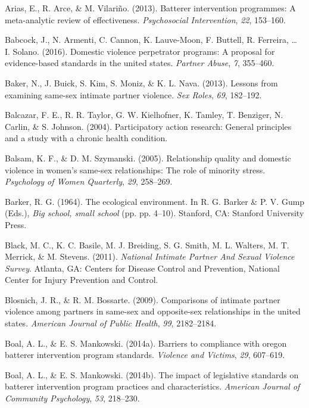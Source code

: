 \documentclass[11pt,]{tufte-book}
\begin{document}
\hypertarget{ref-arias2013batterer}{}
Arias, E., R. Arce, \& M. Vilariño. (2013). Batterer intervention
programmes: A meta-analytic review of effectiveness. \emph{Psychosocial
Intervention}, \emph{22}, 153--160.

\hypertarget{ref-babcock2016domestic}{}
Babcock, J., N. Armenti, C. Cannon, K. Lauve-Moon, F. Buttell, R.
Ferreira, \ldots{} I. Solano. (2016). Domestic violence perpetrator
programs: A proposal for evidence-based standards in the united states.
\emph{Partner Abuse}, \emph{7}, 355--460.

\hypertarget{ref-baker2013lessons}{}
Baker, N., J. Buick, S. Kim, S. Moniz, \& K. L. Nava. (2013). Lessons
from examining same-sex intimate partner violence. \emph{Sex Roles},
\emph{69}, 182--192.

\hypertarget{ref-balcazar2004participatory}{}
Balcazar, F. E., R. R. Taylor, G. W. Kielhofner, K. Tamley, T. Benziger,
N. Carlin, \& S. Johnson. (2004). Participatory action research: General
principles and a study with a chronic health condition.

\hypertarget{ref-balsam2005relationship}{}
Balsam, K. F., \& D. M. Szymanski. (2005). Relationship quality and
domestic violence in women's same-sex relationships: The role of
minority stress. \emph{Psychology of Women Quarterly}, \emph{29},
258--269.

\hypertarget{ref-barker1964ecological}{}
Barker, R. G. (1964). The ecological environment. In R. G. Barker \& P.
V. Gump (Eds.), \emph{Big school, small school} (pp. pp. 4--10).
Stanford, CA: Stanford University Press.

\hypertarget{ref-black2011national}{}
Black, M. C., K. C. Basile, M. J. Breiding, S. G. Smith, M. L. Walters,
M. T. Merrick, \& M. Stevens. (2011). \emph{National Intimate Partner
And Sexual Violence Survey}. Atlanta, GA: Centers for Disease Control
and Prevention, National Center for Injury Prevention and Control.

\hypertarget{ref-blosnich2009comparisons}{}
Blosnich, J. R., \& R. M. Bossarte. (2009). Comparisons of intimate
partner violence among partners in same-sex and opposite-sex
relationships in the united states. \emph{American Journal of Public
Health}, \emph{99}, 2182--2184.

\hypertarget{ref-boal2014barriers}{}
Boal, A. L., \& E. S. Mankowski. (2014a). Barriers to compliance with
oregon batterer intervention program standards. \emph{Violence and
Victims}, \emph{29}, 607--619.

\hypertarget{ref-boal2014impact}{}
Boal, A. L., \& E. S. Mankowski. (2014b). The impact of legislative
standards on batterer intervention program practices and
characteristics. \emph{American Journal of Community Psychology},
\emph{53}, 218--230.
\end{document}
